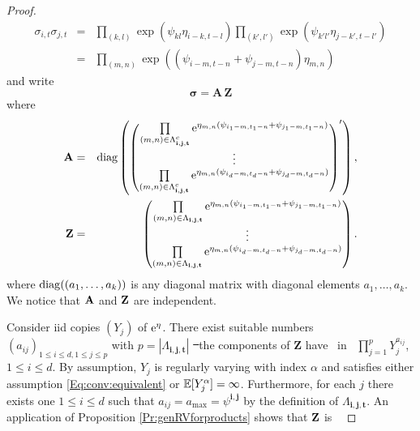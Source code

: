 \begin{proof}
\begin{eqnarray*}
\sigma_{i,t}\sigma_{j,t}&=&\prod_{(k,l)}\exp(\psi_{kl}\eta_{i-k,t-l})\prod_{(k',l' )}\exp(\psi_{k'l'}\eta_{j-k',t-l'}) \\
&=& \prod_{(m,n )}\exp((\psi_{i-m,t-n}+\psi_{j-m,t-n})\eta_{m,n})
\end{eqnarray*}
and write
\begin{equation}
  \label{Eq:factors:sigma}
  \boldsymbol\sigma = \mathbf A\, \mathbf Z
\end{equation}
where
\begin{eqnarray*}
  \mathbf A
  &=&
  \mbox{diag}\left(\left(
      \begin{matrix}
        \prod\limits_{(m,n) \in \Lambda_{\mathbf{i},\mathbf{j},\mathbf{t}}^c}
        {\rm e}^{\eta_{m,n}(\psi_{i_1-m,t_1-n}+\psi_{j_1-m,t_1-n})} \\
        \vdots \\
        \prod\limits_{(m,n) \in \Lambda_{\mathbf{i},\mathbf{j},\mathbf{t}}^c}
        {\rm e}^{\eta_{m,n}(\psi_{i_d-m,t_d-n}+\psi_{j_d-m,t_d-n})}
  \end{matrix}
\right)'\right), \\
\mathbf Z
&=&
\left(
  \begin{matrix}
    \prod\limits_{(m,n) \in \Lambda_{\mathbf{i},\mathbf{j},\mathbf{t}}}
    {\rm e}^{\eta_{m,n}(\psi_{i_1-m,t_1-n}+\psi_{j_1-m,t_1-n})} \\
    \vdots \\
    \prod\limits_{(m,n) \in \Lambda_{\mathbf{i},\mathbf{j},\mathbf{t}}}
    {\rm e}^{\eta_{m,n}(\psi_{i_d-m,t_d-n}+\psi_{j_d-m,t_d-n})}
  \end{matrix}
\right).
\end{eqnarray*}
where ${\rm diag}((a_1,\ldots,a_k))$ is any diagonal matrix with diagonal elements $a_1,\ldots,a_k$. 
We notice that ${\bf A}$ and ${\bf Z}$ are independent.
\par
Consider iid copies $(Y_j)$ of ${\rm e}^\eta$. There exist suitable numbers $(a_{ij})_{1\le i\le d,1\le j\le p}$ with $p= |\Lambda_{\mathbf{i},\mathbf{j},\mathbf{t}}|$
\st\ the components of $\mathbf{Z}$ have \rep\ in \ds\ 
$\prod_{j=1}^{p}Y_j^{a_{ij}}$, $1 \leq i \leq d $. By assumption, $Y_j$ is regularly varying with index $\alpha$ and
satisfies either assumption \eqref{Eq:conv:equivalent} or ${\mathbb E}[Y_j^\alpha]=\infty$. 
Furthermore, for each $j$ there exists one $1\leq i \leq d$ 
such that $a_{ij}=a_{\max}=\psi^{\mathbf{i},\mathbf{j}}$ by the definition of $\Lambda_{\mathbf{i},\mathbf{j},\mathbf{t}}$. 
An application of Proposition \ref{Pr:genRVforproducts} shows that ${\bf Z}$ is \regvary\ 

\end{proof}
